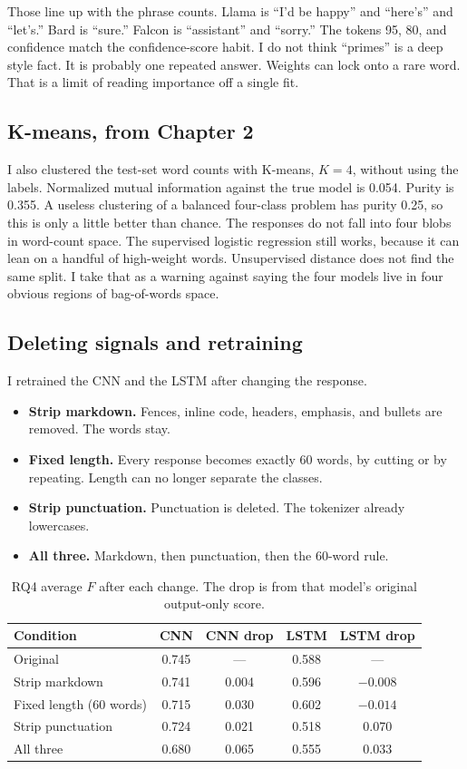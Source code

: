 \documentclass[11pt]{article}
\begin{document}
Those line up with the phrase counts. Llama is ``I'd be happy'' and ``here's'' and ``let's.'' Bard is ``sure.'' Falcon is ``assistant'' and ``sorry.'' The tokens 95, 80, and confidence match the confidence-score habit. I do not think ``primes'' is a deep style fact. It is probably one repeated answer. Weights can lock onto a rare word. That is a limit of reading importance off a single fit.

\subsection{K-means, from Chapter 2}

I also clustered the test-set word counts with K-means, $K = 4$, without using the labels. Normalized mutual information against the true model is 0.054. Purity is 0.355. A useless clustering of a balanced four-class problem has purity 0.25, so this is only a little better than chance. The responses do not fall into four blobs in word-count space. The supervised logistic regression still works, because it can lean on a handful of high-weight words. Unsupervised distance does not find the same split. I take that as a warning against saying the four models live in four obvious regions of bag-of-words space.

\subsection{Deleting signals and retraining}

I retrained the CNN and the LSTM after changing the response.

\begin{itemize}
\item \textbf{Strip markdown.} Fences, inline code, headers, emphasis, and bullets are removed. The words stay.
\item \textbf{Fixed length.} Every response becomes exactly 60 words, by cutting or by repeating. Length can no longer separate the classes.
\item \textbf{Strip punctuation.} Punctuation is deleted. The tokenizer already lowercases.
\item \textbf{All three.} Markdown, then punctuation, then the 60-word rule.
\end{itemize}

\begin{table}[H]
\centering
\caption{RQ4 average $F$ after each change. The drop is from that model's original output-only score.}
\label{tab:ablate}
\begin{tabular}{lcccc}
\toprule
Condition & CNN & CNN drop & LSTM & LSTM drop \\
\midrule
Original & 0.745 & --- & 0.588 & --- \\
Strip markdown & 0.741 & 0.004 & 0.596 & $-0.008$ \\
Fixed length (60 words) & 0.715 & 0.030 & 0.602 & $-0.014$ \\
Strip punctuation & 0.724 & 0.021 & 0.518 & 0.070 \\
All three & 0.680 & 0.065 & 0.555 & 0.033 \\
\bottomrule
\end{tabular}
\end{table}
\end{document}
